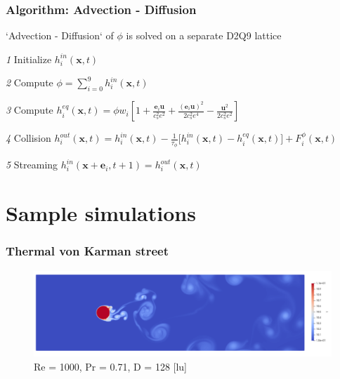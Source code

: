 \documentclass[10pt,handout]{beamer}
\begin{document}
\begin{frame}[plain]\frametitle{Algorithm: Advection - Diffusion}
`Advection - Diffusion` of  $\phi$ is solved on a separate D2Q9 lattice 
\\ \vspace{1.5em}

\textit{1} Initialize 
$ h_i ^{in} (\boldsymbol{x},t) $ \\ \vspace{2.5em}

\textit{2} Compute 
$  \phi = \sum_{i=0}^{9} h_i ^{in}(\boldsymbol{x},t) $ \\ \vspace{2.5em}

\textit{3} Compute 
$ h_i ^{eq}(\boldsymbol{x},t) = \phi w_i  
\left[ 1 + \frac{\boldsymbol{e}_i \boldsymbol{u}}{c_s^2 e^2} + \frac{ (\boldsymbol{e}_i \boldsymbol{u})^2}{2 c_s^2 e^4} - \frac{\boldsymbol{u}^2 } {2c_s^2 e^2} \right]  $  \\ \vspace{2.5em}
 
\textit{4} Collision 
$ h_i ^{out}(\boldsymbol{x},t) = h_i^{in}(\boldsymbol{x},t) - \frac{1}{\tau_\phi} \bigg[ h_i^{in}(\boldsymbol{x},t) - h_i^{eq}(\boldsymbol{x},t) \bigg] +  F_i^{\phi}(\bm{x}, t )$ \\ \vspace{2.5em}

\textit{5} Streaming 
$  h_i ^{in}(\boldsymbol{x} + \boldsymbol{e}_i ,t+1) =  h_i^{out} (\boldsymbol{x},t) $ \\ \vspace{2.5em}

\end{frame} 

\section{Sample simulations}


\begin{frame}\frametitle{Thermal von Karman street}
\begin{center}
\begin{figure}
\includegraphics[width = \textwidth]{obrazki/HotKarman_Re1000.png} 
\caption{Re = 1000, Pr = 0.71, D = 128 [lu]}
\end{figure}
\end{center}
\end{frame}
\end{document}
